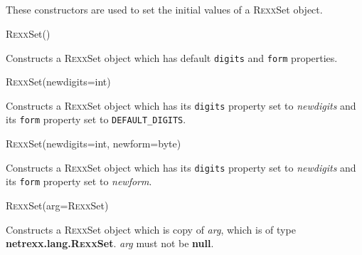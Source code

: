 \subsection{}\label{}
 
These constructors are used to set the initial values of a R\textsc{exx}Set
object.
\begin{description}
\item{R\textsc{exx}Set()}

Constructs a R\textsc{exx}Set object which has default \texttt{digits} and
\texttt{form} properties.
\item{R\textsc{exx}Set(newdigits=int)}

Constructs a R\textsc{exx}Set object which has its \texttt{digits} property set
to \emph{newdigits} and its \texttt{form} property set
to \texttt{DEFAULT\_DIGITS}.
\item{R\textsc{exx}Set(newdigits=int, newform=byte)}

Constructs a R\textsc{exx}Set object which has its \texttt{digits} property set
to \emph{newdigits} and its \texttt{form} property set to
\emph{newform}.
\item{R\textsc{exx}Set(arg=R\textsc{exx}Set)}

Constructs a R\textsc{exx}Set object which is copy of \emph{arg}, which is of
type \textbf{netrexx.lang.R\textsc{exx}Set}.
\emph{arg} must not be \textbf{null}.
\end{description}
\subsection{}\label{}
 
